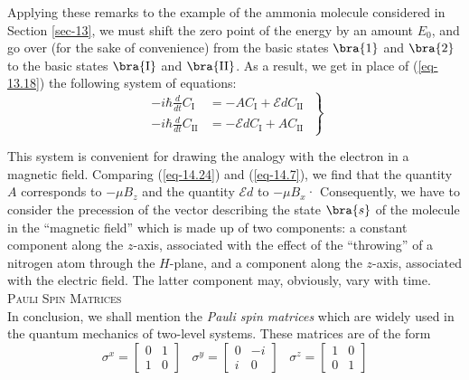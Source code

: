\documentclass[a4paper,sfsidenotes,colorlinks=true]{tufte-book}
\numberwithin{equation}{section}
\numberwithin{figure}{section}
\newcommand{\Ea}{\mathcal{E}}
\begin{document}
Applying these remarks to the example of the ammonia molecule
considered in Section \ref{sec-13}, we must shift the zero point of
the energy by an amount $E_{0}$, and go over (for the sake of
convenience) from the basic states $\bra{1}$ and $\bra{2}$ to the
basic states $\bra{\mathrm{I}}$ and $\bra{\mathrm{II}}$. As a result, we get in place of
(\ref{eq-13.18}) the following system of equations:
\begin{equation}%
\left.
\begin{split}
-i \hbar \frac{d}{dt} C_{\mathrm{I}} & = - A C_{\mathrm{I}} + \Ea d C_{\mathrm{II}} \\   
-i \hbar \frac{d}{dt} C_{\mathrm{II}} & = - \Ea d C_{\mathrm{I}} + A C_{\mathrm{II}} 
\end{split}
\; \right\}
\label{eq-14.24}
\end{equation}

This system is convenient for drawing the analogy with the electron in
a magnetic field. Comparing (\ref{eq-14.24}) and (\ref{eq-14.7}), we
find that the quantity $A$ corresponds to $- \mu B_{z}$ and the
quantity $\Ea d$ to $- \mu B_{x}$· Consequently, we have to consider
the precession of the vector describing the state $\bra{s}$ of the
molecule in the ``magnetic field'' which is made up of two components:
a constant component along the $z$-axis, associated with the effect of
the ``throwing'' of a nitrogen atom through the $H$-plane, and a component along the $z$-axis, associated with the electric field. The
latter component may, obviously, vary with time.\\[8pt]

\textsc{Pauli Spin Matrices}\\[5pt]
{\small In conclusion, we shall mention the \emph{Pauli spin
    matrices} which are widely used in the quantum mechanics of
  two-level systems. These matrices are of the form}
\begin{equation}%
\sigma^{x}= 
\begin{bmatrix}
0 & 1 \\
1 & 0
\end{bmatrix}
\;\;\; 
\sigma^{y}= 
\begin{bmatrix}
0 & -i \\
i & 0
\end{bmatrix}
\;\;\;
\sigma^{z}= 
\begin{bmatrix}
1 & 0 \\
0 & 1
\end{bmatrix}
\label{eq-14.25}
\end{equation}
\end{document}
